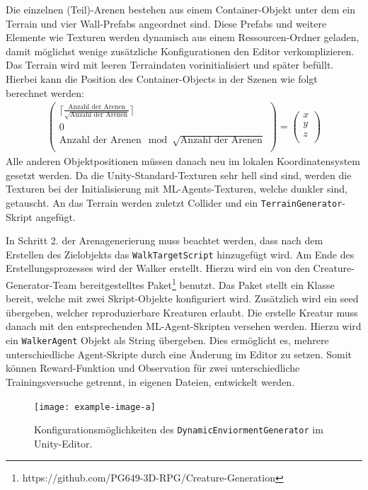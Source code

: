 Die einzelnen (Teil)-Arenen bestehen aus einem Container-Objekt unter dem ein Terrain und vier Wall-Prefabs angeordnet sind. Diese Prefabs und weitere Elemente wie Texturen werden dynamisch aus einem Ressourcen-Ordner geladen, damit möglichst wenige zusätzliche Konfigurationen den Editor verkomplizieren. Das Terrain wird mit leeren Terraindaten vorinitialisiert und später befüllt. Hierbei kann die Position des Container-Objects in der Szenen wie folgt berechnet werden:
\begin{align}
	\begin{pmatrix}
	\lceil \frac{\text{Anzahl der Arenen}}{\sqrt{\text{Anzahl der Arenen}}} \rceil \\
	0 \\
	\text{Anzahl der Arenen} \mod \sqrt{\text{Anzahl der Arenen}} \\
	\end{pmatrix}
	 = 	\begin{pmatrix}
	 x  \\
	 y \\
	 z  \\
	 \end{pmatrix}
\end{align}
Alle anderen Objektpositionen müssen danach neu im lokalen Koordinatensystem gesetzt werden. Da die Unity-Standard-Texturen sehr hell sind sind, werden die Texturen bei der Initialisierung mit ML-Agents-Texturen, welche dunkler sind, getauscht. An das Terrain werden zuletzt Collider und ein \texttt{TerrainGenerator}-Skript angefügt. 

In Schritt 2. der Arenagenerierung muss beachtet werden, dass nach dem Erstellen des Zielobjekts das \texttt{WalkTargetScript} hinzugefügt wird. Am Ende des Erstellungsprozesses wird der Walker erstellt. Hierzu wird ein von den Creature-Generator-Team bereitgestelltes Paket\footnote{https://github.com/PG649-3D-RPG/Creature-Generation} benutzt. Das Paket stellt ein Klasse bereit, welche mit zwei Skript-Objekte konfiguriert wird. Zusätzlich wird ein seed übergeben, welcher reproduzierbare Kreaturen erlaubt. Die erstelle Kreatur muss danach mit den entsprechenden ML-Agent-Skripten versehen werden. Hierzu wird ein \texttt{WalkerAgent} Objekt als String übergeben. Dies ermöglicht es, mehrere unterschiedliche Agent-Skripte durch eine Änderung im Editor zu setzen. Somit können Reward-Funktion und Observation für zwei unterschiedliche Trainingsversuche getrennt, in eigenen Dateien, entwickelt werden.
\begin{figure}
	\centering
	\texttt{[image: example-image-a]}
	\caption[Konfigurationsmöglichkeiten des \texttt{DynamicEnviormentGenerator}]{Konfigurationsmöglichkeiten des \texttt{DynamicEnviormentGenerator} im Unity-Editor.} %
	\label{bspDEGOptionen}
\end{figure}

